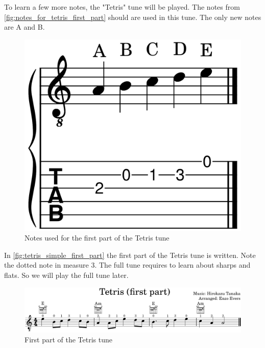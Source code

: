 \newpage

To learn a few more notes, the "Tetris" tune will be played. The notes from \autoref{fig:notes_for_tetris_first_part} should are used in this tune. The only new notes are A and B.

\begin{figure}[h]
	\centering
	\includegraphics[height=0.12\textheight]{../../MuseScore/Guitar/NotesUsedInTetris_FirstPart.png}
	\caption{Notes used for the first part of the Tetris tune}
	\label{fig:notes_for_tetris_first_part}
\end{figure}

In \autoref{fig:tetris_simple_first_part} the first part of the Tetris tune is written. Note the dotted note in measure 3. The full tune requires to learn about sharps and flats. So we will play the full tune later.

\begin{figure}[h]
	\centering
	\includegraphics[width=\textwidth]{../../MuseScore/Guitar/GuitarTetrisFirstPart.png}
	\caption{First part of the Tetris tune}
	\label{fig:tetris_simple_first_part}
\end{figure}

